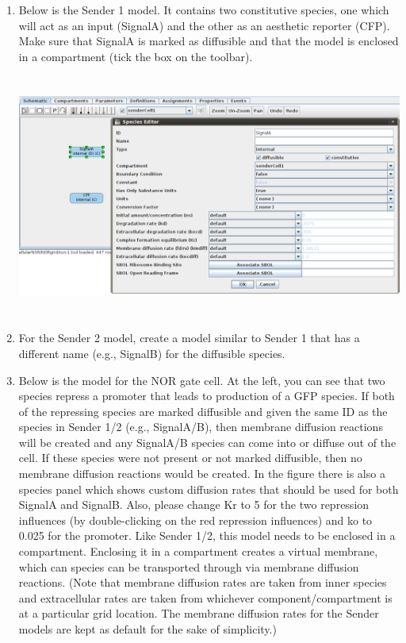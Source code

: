 \documentclass[titlepage,11pt]{article}
\begin{document}
\begin{enumerate}

\item Below is the Sender 1 model.  It contains two constitutive species, one which will act as an input (SignalA) and the other as an aesthetic reporter (CFP).  Make sure that SignalA is marked as diffusible and that the model is enclosed in a compartment (tick the box on the toolbar).

\includegraphics[height=80mm]{screenshots/sender1}

\item For the Sender 2 model, create a model similar to Sender 1 that has a different name (e.g., SignalB) for the diffusible species.

\item Below is the model for the NOR gate cell.  At the left, you can see that two species repress a promoter that leads to production of a GFP species.  If both of the repressing species are marked diffusible and given the same ID as the species in Sender 1/2 (e.g., SignalA/B), then membrane diffusion reactions will be created and any SignalA/B species can come into or diffuse out of the cell.  If these species were not present or not marked diffusible, then no membrane diffusion reactions would be created.  In the figure there is also a species panel which shows custom diffusion rates that should be used for both SignalA and SignalB.  Also, please change Kr to 5 for the two repression influences (by double-clicking on the red repression influences) and ko to 0.025 for the promoter.  Like Sender 1/2, this model needs to be enclosed in a compartment.  Enclosing it in a compartment creates a virtual membrane, which can species can be transported through via membrane diffusion reactions.  (Note that membrane diffusion rates are taken from inner species and extracellular rates are taken from whichever component/compartment is at a particular grid location.  The membrane diffusion rates for the Sender models are kept as default for the sake of simplicity.)


\end{enumerate}
\end{document}
